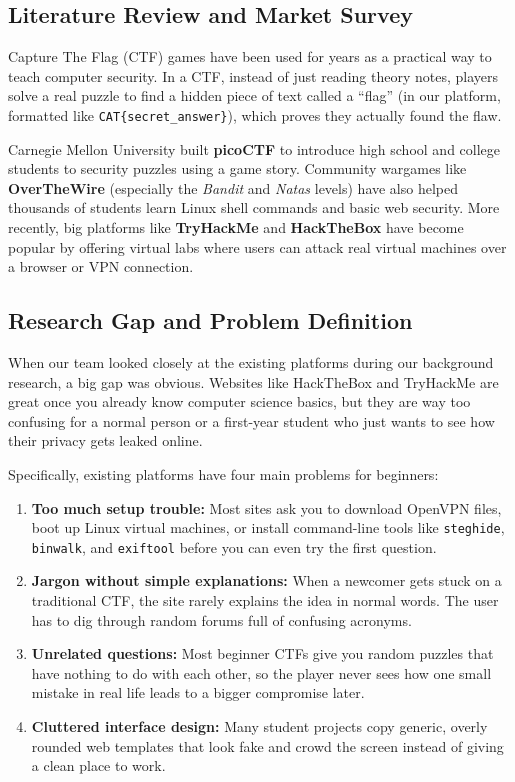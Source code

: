 \documentclass[11pt,a4paper]{article}
\begin{document}
\subsection{Literature Review and Market Survey}
Capture The Flag (CTF) games have been used for years as a practical way to teach computer security. In a CTF, instead of just reading theory notes, players solve a real puzzle to find a hidden piece of text called a ``flag'' (in our platform, formatted like \texttt{CAT\{secret\_answer\}}), which proves they actually found the flaw.

Carnegie Mellon University built \textbf{picoCTF} to introduce high school and college students to security puzzles using a game story. Community wargames like \textbf{OverTheWire} (especially the \textit{Bandit} and \textit{Natas} levels) have also helped thousands of students learn Linux shell commands and basic web security. More recently, big platforms like \textbf{TryHackMe} and \textbf{HackTheBox} have become popular by offering virtual labs where users can attack real virtual machines over a browser or VPN connection.


\subsection{Research Gap and Problem Definition}
When our team looked closely at the existing platforms during our background research, a big gap was obvious. Websites like HackTheBox and TryHackMe are great once you already know computer science basics, but they are way too confusing for a normal person or a first-year student who just wants to see how their privacy gets leaked online.

Specifically, existing platforms have four main problems for beginners:
\begin{enumerate}
    \item \textbf{Too much setup trouble:} Most sites ask you to download OpenVPN files, boot up Linux virtual machines, or install command-line tools like \texttt{steghide}, \texttt{binwalk}, and \texttt{exiftool} before you can even try the first question.
    \item \textbf{Jargon without simple explanations:} When a newcomer gets stuck on a traditional CTF, the site rarely explains the idea in normal words. The user has to dig through random forums full of confusing acronyms.
    \item \textbf{Unrelated questions:} Most beginner CTFs give you random puzzles that have nothing to do with each other, so the player never sees how one small mistake in real life leads to a bigger compromise later.
    \item \textbf{Cluttered interface design:} Many student projects copy generic, overly rounded web templates that look fake and crowd the screen instead of giving a clean place to work.
\end{enumerate}
\end{document}
